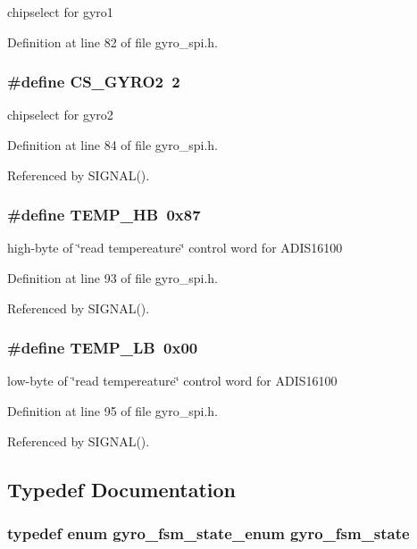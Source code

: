 chipselect for gyro1 

Definition at line 82 of file gyro\_\-spi.h.
\subsubsection{\setlength{\rightskip}{0pt plus 5cm}\#define CS\_\-GYRO2~2}\label{group__ro__spi_g978f20355e200c3fedebfc6cb0535bbd}


chipselect for gyro2 

Definition at line 84 of file gyro\_\-spi.h.

Referenced by SIGNAL().
\subsubsection{\setlength{\rightskip}{0pt plus 5cm}\#define TEMP\_\-HB~0x87}\label{group__ro__spi_g2155b4e3dd30cb96d7c222d615f4f59d}


high-byte of \char`\"{}read tempereature\char`\"{} control word for ADIS16100 

Definition at line 93 of file gyro\_\-spi.h.

Referenced by SIGNAL().
\subsubsection{\setlength{\rightskip}{0pt plus 5cm}\#define TEMP\_\-LB~0x00}\label{group__ro__spi_g66d7c5f2e300719c9944c97ee6127184}


low-byte of \char`\"{}read tempereature\char`\"{} control word for ADIS16100 

Definition at line 95 of file gyro\_\-spi.h.

Referenced by SIGNAL().

\subsection{Typedef Documentation}
\subsubsection{\setlength{\rightskip}{0pt plus 5cm}typedef enum {\bf gyro\_\-fsm\_\-state\_\-enum}  {\bf gyro\_\-fsm\_\-state}}\label{group__ro__spi_gf39dfe96bed1eb685c907e39f5eb98a7}



